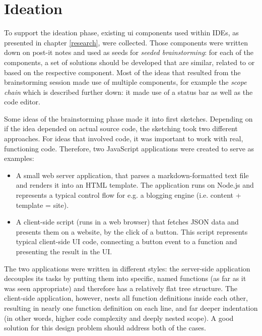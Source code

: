 \section{Ideation}\label{ideation-1}

To support the ideation phase, existing \ac{ui} components used within
IDEs, as presented in chapter \ref{research}, were collected. Those
components were written down on post-it notes and used as seeds for
\emph{seeded brainstorming}: for each of the components, a set of
solutions should be developed that are similar, related to or based on
the respective component. Most of the ideas that resulted from the
brainstorming session made use of multiple components, for example the
\emph{scope chain} which is described further down: it made use of a
status bar as well as the code editor.

Some ideas of the brainstorming phase made it into first sketches.
Depending on if the idea depended on actual source code, the sketching
took two different approaches. For ideas that involved code, it was
important to work with real, functioning code. Therefore, two JavaScript
applications were created to serve as examples:

\begin{itemize}
\itemsep1pt\parskip0pt
\item
  A small web server application, that parses a markdown-formatted text
  file and renders it into an HTML template. The application runs on
  Node.js and represents a typical control flow for e.g. a blogging
  engine (i.e. content + template = site).
\item
  A client-side script (runs in a web browser) that fetches JSON data
  and presents them on a website, by the click of a button. This script
  represents typical client-side UI code, connecting a button event to a
  function and presenting the result in the UI.
\end{itemize}

The two applications were written in different styles: the server-side
application decouples its tasks by putting them into specific, named
functions (as far as it was seen appropriate) and therefore has a
relatively flat tree structure. The client-side application, however,
nests all function definitions inside each other, resulting in nearly
one function definition on each line, and far deeper indentation (in
other words, higher code complexity and deeply nested scope). A good
solution for this design problem should address both of the cases.


